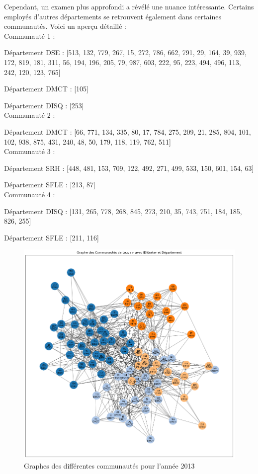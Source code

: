\documentclass{article}
\begin{document}
Cependant, un examen plus approfondi a révélé une nuance intéressante. Certains employés d'autres départements se retrouvent également dans certaines communautés. Voici un aperçu détaillé : \\

Communauté 1 :

Département DSE : [513, 132, 779, 267, 15, 272, 786, 662, 791, 29, 164, 39, 939, 172, 819, 181, 311, 56, 194, 196, 205, 79, 987, 603, 222, 95, 223, 494, 496, 113, 242, 120, 123, 765]

Département DMCT : [105]

Département DISQ : [253] \\

Communauté 2 :

Département DMCT : [66, 771, 134, 335, 80, 17, 784, 275, 209, 21, 285, 804, 101, 102, 938, 875, 431, 240, 48, 50, 179, 118, 119, 762, 511] \\

Communauté 3 :

Département SRH : [448, 481, 153, 709, 122, 492, 271, 499, 533, 150, 601, 154, 63]

Département SFLE : [213, 87] \\

Communauté 4 :

Département DISQ : [131, 265, 778, 268, 845, 273, 210, 35, 743, 751, 184, 185, 826, 255]

Département SFLE : [211, 116] \\

\begin{figure}[!h]
    \centering
    \includegraphics[width=15cm]{assets/communaute/communaute_2013.png}
    \caption{Graphes des différentes communautés pour l'année 2013}
    \label{fig:communaute_2013}
\end{figure}
\end{document}
